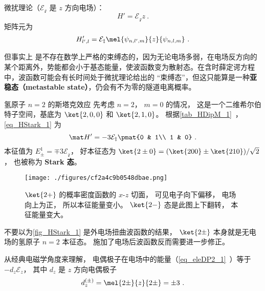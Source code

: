 
\begin{issues}
\issueDraft
\end{issues}


微扰理论（$\mathcal{E_z}$ 是 $z$ 方向电场）：
\begin{equation}
H' = \mathcal{E_z} z~.
\end{equation}
矩阵元为
\begin{equation}\label{eq_HStark_1}
H'_{l',l} = \mathcal{E_z}\mel{\psi_{n,l',m}}{z}{\psi_{n,l,m}}~.
\end{equation}

但事实上 是不存在数学上严格的束缚态的，因为无论电场多弱，在电场反方向的某个距离外，势能都会小于基态能量，使波函数变为散射态。在含时薛定谔方程中，波函数可能会有长时间处于微扰理论给出的 “束缚态”，但这只能算是一种\textbf{亚稳态（metastable state）}，仍会有不为零的隧道电离概率。

\begin{example}{氢原子 $n=2$ 的斯塔克效应}
先考虑 $n=2$， $m=0$ 的情况， 这是一个二维希尔伯特子空间，基底为 $\ket{2,0,0}$ 和 $\ket{2,1,0}$。 根据\autoref{tab_HDipM_1}~， \autoref{eq_HStark_1} 为
\begin{equation}
\mat H' = -3\mathcal{E_z}\pmat{0 & 1\\ 1 & 0}~.
\end{equation}
本征值为 $E_{\pm}^1 = \mp 3\mathcal{E_z}$， 好本征态为 $\ket{2\pm 0} = (\ket{200} \pm \ket{210})/{\sqrt 2}$， 也被称为 \textbf{Stark 态}。

\begin{figure}[ht]
\centering
\texttt{[image: ./figures/cf2a4c9b0548dbae.png]}
\caption{$\ket{2+}$ 的概率密度函数的 $x$-$z$ 切面， 可见电子向下偏移， 电场向上为正， 所以本征能量变小。 $\ket{2-}$ 态是此图上下翻转， 本征能量变大。} \label{fig_HStark_1}
\end{figure}

不要以为\autoref{fig_HStark_1} 是外电场扭曲波函数的结果， $\ket{2\pm}$ 本身就是无电场的氢原子 $n=2$ 本征态。 施加了电场后波函数反而需要进一步修正。

从经典电磁学角度来理解， 电偶极子在电场中的能量（\autoref{eq_eleDP2_1}~）等于 $-d_z \mathcal{E}_z$， 其中 $d_z$ 是 $z$ 方向电偶极子
\begin{equation}
d_z^{(\pm)} = \mel{2\pm}{z}{2\pm} = \pm 3~.
\end{equation}
\end{example}


